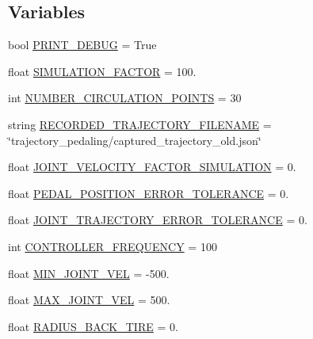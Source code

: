 \subsection*{Variables}
\begin{DoxyCompactItemize}
\item 
bool \mbox{\hyperlink{namespacepedal__simulation_ac01ec3a6a2b3bfa546ca8317b4064fd7}{P\+R\+I\+N\+T\+\_\+\+D\+E\+B\+UG}} = True
\item 
float \mbox{\hyperlink{namespacepedal__simulation_a4ab5f9730fed07a39036266b7569a11b}{S\+I\+M\+U\+L\+A\+T\+I\+O\+N\+\_\+\+F\+A\+C\+T\+OR}} = 100.
\item 
int \mbox{\hyperlink{namespacepedal__simulation_a089f67622f7fab501aeff267674320c9}{N\+U\+M\+B\+E\+R\+\_\+\+C\+I\+R\+C\+U\+L\+A\+T\+I\+O\+N\+\_\+\+P\+O\+I\+N\+TS}} = 30
\item 
string \mbox{\hyperlink{namespacepedal__simulation_a8090f9acb65db197227394489b01e764}{R\+E\+C\+O\+R\+D\+E\+D\+\_\+\+T\+R\+A\+J\+E\+C\+T\+O\+R\+Y\+\_\+\+F\+I\+L\+E\+N\+A\+ME}} = \char`\"{}trajectory\+\_\+pedaling/captured\+\_\+trajectory\+\_\+old.\+json\char`\"{}
\item 
float \mbox{\hyperlink{namespacepedal__simulation_a1054461e7ed9df128c97748e3883bef8}{J\+O\+I\+N\+T\+\_\+\+V\+E\+L\+O\+C\+I\+T\+Y\+\_\+\+F\+A\+C\+T\+O\+R\+\_\+\+S\+I\+M\+U\+L\+A\+T\+I\+ON}} = 0.
\item 
float \mbox{\hyperlink{namespacepedal__simulation_aec7366c58850a21df44793bed8baf7a7}{P\+E\+D\+A\+L\+\_\+\+P\+O\+S\+I\+T\+I\+O\+N\+\_\+\+E\+R\+R\+O\+R\+\_\+\+T\+O\+L\+E\+R\+A\+N\+CE}} = 0.
\item 
float \mbox{\hyperlink{namespacepedal__simulation_a4cd59087b814eb188e34704ca32b3551}{J\+O\+I\+N\+T\+\_\+\+T\+R\+A\+J\+E\+C\+T\+O\+R\+Y\+\_\+\+E\+R\+R\+O\+R\+\_\+\+T\+O\+L\+E\+R\+A\+N\+CE}} = 0.
\item 
int \mbox{\hyperlink{namespacepedal__simulation_a3a4de9c574500f2527349752b61fd818}{C\+O\+N\+T\+R\+O\+L\+L\+E\+R\+\_\+\+F\+R\+E\+Q\+U\+E\+N\+CY}} = 100
\item 
float \mbox{\hyperlink{namespacepedal__simulation_a8c68da91f067c8c1233bf261395da999}{M\+I\+N\+\_\+\+J\+O\+I\+N\+T\+\_\+\+V\+EL}} = -\/500.
\item 
float \mbox{\hyperlink{namespacepedal__simulation_aaef14839ae1d152eee18eb8c4919e191}{M\+A\+X\+\_\+\+J\+O\+I\+N\+T\+\_\+\+V\+EL}} = 500.
\item 
float \mbox{\hyperlink{namespacepedal__simulation_a09c792358e9985558aa3a05f2b603dfe}{R\+A\+D\+I\+U\+S\+\_\+\+B\+A\+C\+K\+\_\+\+T\+I\+RE}} = 0.

\end{DoxyCompactItemize}
